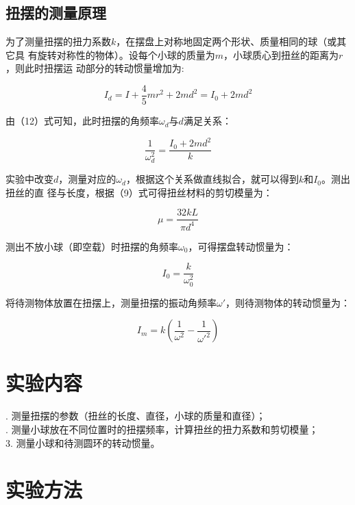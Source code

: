 \documentclass[UTF8]{ctexart}
\begin{document}
\subsection{扭摆的测量原理}
\noindent 为了测量扭摆的扭力系数$k$，在摆盘上对称地固定两个形状、质量相同的球（或其它具
有旋转对称性的物体）。设每个小球的质量为$m$，小球质心到扭丝的距离为$r$，则此时扭摆运
动部分的转动惯量增加为:

\begin{equation}
  I_d = I + \frac{4}{5}mr^2 + 2md^2 = I_0 + 2md^2
\end{equation}

由（12）式可知，此时扭摆的角频率$\omega_d$与$d$满足关系：

\begin{equation}
  \frac{1}{\omega_d^2} = \frac{I_0 + 2md^2}{k}
\end{equation}

\noindent 实验中改变$d$，测量对应的$\omega_d$，根据这个关系做直线拟合，就可以得到$k$和$I_0$。测出扭丝的直
径与长度，根据（9）式可得扭丝材料的剪切模量为：

\begin{equation}
  \mu = \frac{32kL}{\pi d^4}
\end{equation}

测出不放小球（即空载）时扭摆的角频率$\omega_0$，可得摆盘转动惯量为：

\begin{equation}
  I_0 = \frac{k}{\omega_0^2}
\end{equation}

将待测物体放置在扭摆上，测量扭摆的振动角频率$\omega'$，则待测物体的转动惯量为：

\begin{equation}
  I_m = k(\frac{1}{\omega^2} - \frac{1}{\omega'^2})
\end{equation}

\section{实验内容}

. 测量扭摆的参数（扭丝的长度、直径，小球的质量和直径）； \\
. 测量小球放在不同位置时的扭摆频率，计算扭丝的扭力系数和剪切模量；\\ 
3. 测量小球和待测圆环的转动惯量。

\section{实验方法}
\end{document}
